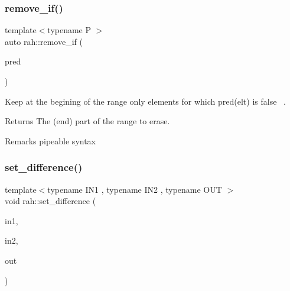 \subsubsection{\texorpdfstring{remove\_if()}{remove\_if()}\hspace{0.1cm}{\footnotesize\ttfamily [2/2]}}
{\footnotesize\ttfamily template$<$typename P $>$ \\
auto rah\+::remove\+\_\+if (\begin{DoxyParamCaption}\item[{P \&\&}]{pred }\end{DoxyParamCaption})}



Keep at the begining of the range only elements for which pred(elt) is false~\newline
. 

\begin{DoxyReturn}{Returns}
The (end) part of the range to erase. 
\end{DoxyReturn}
\begin{DoxyRemark}{Remarks}
pipeable syntax
\end{DoxyRemark}

\begin{DoxyCodeInclude}{0}
\end{DoxyCodeInclude}
\mbox{\label{namespacerah_aca8dbcc943f7c503acea5f58f231a5af}} 
\subsubsection{\texorpdfstring{set\_difference()}{set\_difference()}}
{\footnotesize\ttfamily template$<$typename I\+N1 , typename I\+N2 , typename O\+UT $>$ \\
void rah\+::set\+\_\+difference (\begin{DoxyParamCaption}\item[{I\+N1 \&\&}]{in1,  }\item[{I\+N2 \&\&}]{in2,  }\item[{O\+UT \&\&}]{out }\end{DoxyParamCaption})}




